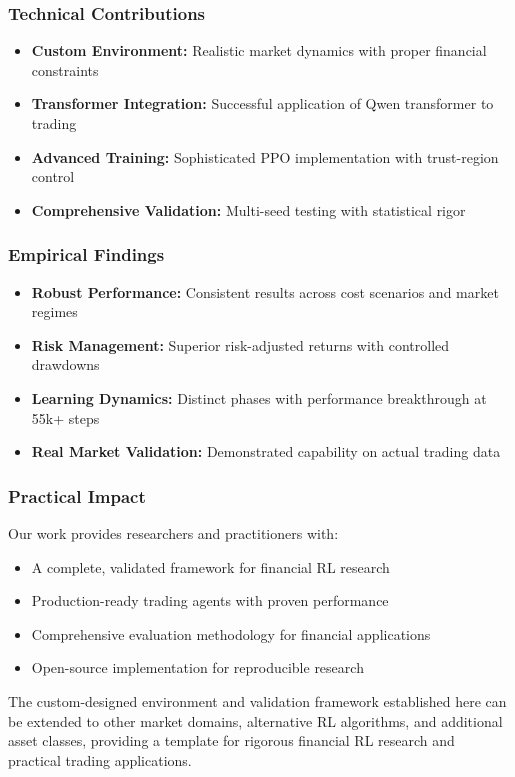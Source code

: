 \documentclass[10pt,journal]{IEEEtran}
\begin{document}
\subsubsection{Technical Contributions}
\begin{itemize}
\item \textbf{Custom Environment:} Realistic market dynamics with proper financial constraints
\item \textbf{Transformer Integration:} Successful application of Qwen transformer to trading
\item \textbf{Advanced Training:} Sophisticated PPO implementation with trust-region control
\item \textbf{Comprehensive Validation:} Multi-seed testing with statistical rigor
\end{itemize}

\subsubsection{Empirical Findings}
\begin{itemize}
\item \textbf{Robust Performance:} Consistent results across cost scenarios and market regimes
\item \textbf{Risk Management:} Superior risk-adjusted returns with controlled drawdowns
\item \textbf{Learning Dynamics:} Distinct phases with performance breakthrough at 55k+ steps
\item \textbf{Real Market Validation:} Demonstrated capability on actual trading data
\end{itemize}

\subsubsection{Practical Impact}
Our work provides researchers and practitioners with:
\begin{itemize}
\item A complete, validated framework for financial RL research
\item Production-ready trading agents with proven performance
\item Comprehensive evaluation methodology for financial applications
\item Open-source implementation for reproducible research
\end{itemize}

The custom-designed environment and validation framework established here can be extended to other market domains, alternative RL algorithms, and additional asset classes, providing a template for rigorous financial RL research and practical trading applications.
\end{document}
